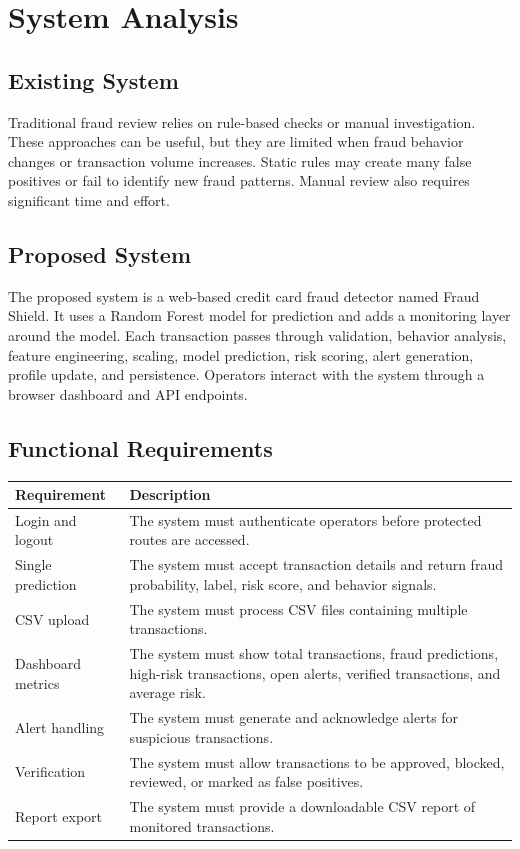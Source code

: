 \documentclass[12pt,a4paper]{report}
\begin{document}
\chapter{System Analysis}

\section{Existing System}
Traditional fraud review relies on rule-based checks or manual investigation. These approaches can be useful, but they are limited when fraud behavior changes or transaction volume increases. Static rules may create many false positives or fail to identify new fraud patterns. Manual review also requires significant time and effort.

\section{Proposed System}
The proposed system is a web-based credit card fraud detector named Fraud Shield. It uses a Random Forest model for prediction and adds a monitoring layer around the model. Each transaction passes through validation, behavior analysis, feature engineering, scaling, model prediction, risk scoring, alert generation, profile update, and persistence. Operators interact with the system through a browser dashboard and API endpoints.

\section{Functional Requirements}
\begin{longtable}{p{} p{}}
\toprule
\textbf{Requirement} & \textbf{Description} \\
\midrule
Login and logout & The system must authenticate operators before protected routes are accessed. \\
Single prediction & The system must accept transaction details and return fraud probability, label, risk score, and behavior signals. \\
CSV upload & The system must process CSV files containing multiple transactions. \\
Dashboard metrics & The system must show total transactions, fraud predictions, high-risk transactions, open alerts, verified transactions, and average risk. \\
Alert handling & The system must generate and acknowledge alerts for suspicious transactions. \\
Verification & The system must allow transactions to be approved, blocked, reviewed, or marked as false positives. \\
Report export & The system must provide a downloadable CSV report of monitored transactions. \\
\bottomrule
\end{longtable}
\end{document}

